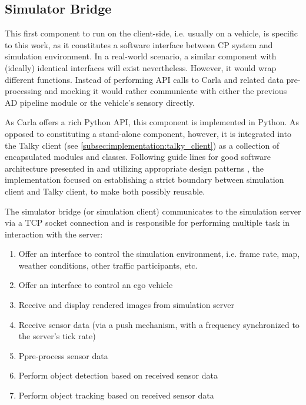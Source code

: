 \subsection{Simulator Bridge}
\label{subsec:implementation:simulator_bridge}
This first component to run on the client-side, i.e. usually on a vehicle, is specific to this work, as it constitutes a software interface between CP system and simulation environment. In a real-world scenario, a similar component with (ideally) identical interfaces will exist nevertheless. However, it would wrap different functions. Instead of performing API calls to Carla and related data pre-processing and mocking it would rather communicate with either the previous AD pipeline module or the vehicle's sensory directly. 

As Carla offers a rich Python API, this component is implemented in Python. As opposed to constituting a stand-alone component, however, it is integrated into the Talky client (see \autoref{subsec:implementation:talky_client}) as a collection of encapsulated modules and classes. Following guide lines for good software architecture presented in \cite{Martin2017} and utilizing appropriate design patterns \cite{EricFreemanElisabethFreemanBertBates2013}, the implementation focused on establishing a strict boundary between simulation client and Talky client, to make both possibly reusable.

The simulator bridge (or simulation client) communicates to the simulation server via a TCP socket connection and is responsible for performing multiple task in interaction with the server:

\begin{enumerate}
	\item Offer an interface to control the simulation environment, i.e. frame rate, map, weather conditions, other traffic participants, etc.
	\item Offer an interface to control an ego vehicle
	\item Receive and display rendered images from simulation server
	\item Receive sensor data (via a push mechanism, with a frequency synchronized to the server's tick rate)
	\item Ppre-process sensor data
	\item Perform object detection based on received sensor data
	\item Perform object tracking based on received sensor data
\end{enumerate}

